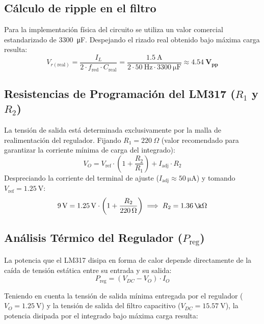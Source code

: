 \documentclass[12pt,a4paper]{article}
\begin{document}
\subsection{Cálculo de ripple en el filtro}
Para la implementación física del circuito se utiliza un valor comercial estandarizado de \SI{3300}{\micro\F}. Despejando el rizado real obtenido bajo máxima carga resulta:
\begin{equation}
    V_{r(\text{real})} = \frac{I_L}{2 \cdot f_{\text{red}} \cdot C_{\text{real}}} = \frac{\SI{1.5}{\A}}{2 \cdot \SI{50}{\Hz} \cdot \SI{3300}{\micro\F}} \approx \mathbf{\SI{4.54}{\V_{\text{pp}}}}
\end{equation}


\subsection{Resistencias de Programación del LM317 \texorpdfstring{($R_1$ y $R_2$)}{(R1 y R2)}}
La tensión de salida está determinada exclusivamente por la malla de realimentación del regulador. Fijando $R_1 = \SI{220}{\Omega}$ (valor recomendado para garantizar la corriente mínima de carga del integrado):
\begin{equation}
    V_O = V_{\text{ref}} \cdot \left(1 + \frac{R_2}{R_1}\right) + I_{\text{adj}} \cdot R_2
\end{equation}
Despreciando la corriente del terminal de ajuste ($I_{\text{adj}} \approx \SI{50}{\micro\A}$) y tomando $V_{\text{ref}} = \SI{1.25}{\V}$:
\begin{equation}
    \SI{9}{\V} = \SI{1.25}{\V} \cdot \left(1 + \frac{R_2}{\SI{220}{\Omega}}\right) \implies R_2 = \mathbf{\SI{1.36}{\k\Omega}}
\end{equation}

\subsection{Análisis Térmico del Regulador \texorpdfstring{($P_{\text{reg}}$)}{(Preg)}}
La potencia que el LM317 disipa en forma de calor depende directamente de la caída de tensión estática entre su entrada y su salida:
\begin{equation}
    P_{\text{reg}} = (V_{DC} - V_O) \cdot I_O
\end{equation}

Teniendo en cuenta la tensión de salida mínima entregada por el regulador ($V_O = \SI{1.25}{\V}$) y la tensión de salida
del filtro capacitivo ($V_{DC} = \SI{15.57}{\V}$), la potencia disipada por el integrado bajo máxima carga resulta:
\end{document}
